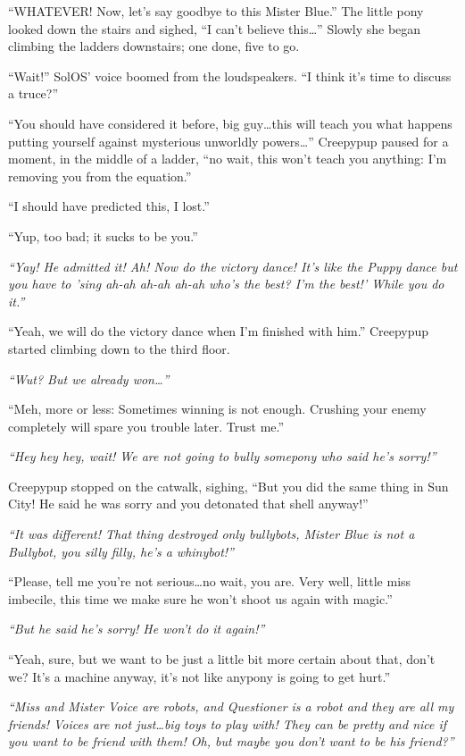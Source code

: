 ``WHATEVER! Now, let's say goodbye to this Mister Blue.'' The little pony looked down the stairs and sighed, ``I can't believe this\dots'' Slowly she began climbing the ladders downstairs; one done, five to go.

``Wait!'' SolOS' voice boomed from the loudspeakers. ``I think it's time to discuss a truce?''

``You should have considered it before, big guy\dots this will teach you what happens putting yourself against mysterious unworldly powers\dots'' Creepypup paused for a moment, in the middle of a ladder, ``no wait, this won't teach you anything: I'm removing you from the equation.''

``I should have predicted this, I lost.''

``Yup, too bad; it sucks to be you.''

\emph{``Yay! He admitted it! Ah! Now do the victory dance! It's like the Puppy dance but you have to 'sing ah-ah ah-ah ah-ah who's the best? I'm the best!' While you do it.''}

``Yeah, we will do the victory dance when I'm finished with him.'' Creepypup started climbing down to the third floor.

\emph{``Wut? But we already won\dots''}

``Meh, more or less: Sometimes winning is not enough. Crushing your enemy completely will spare you trouble later. Trust me.''

\emph{``Hey hey hey, wait! We are not going to bully somepony who said he's sorry!''}

Creepypup stopped on the catwalk, sighing, ``But you did the same thing in Sun City! He said he was sorry and you detonated that shell anyway!''

\emph{``It was different! That thing destroyed only bullybots, Mister Blue is not a Bullybot, you silly filly, he's a whinybot!''}

``Please, tell me you're not serious\dots no wait, you are. Very well, little miss imbecile, this time we make sure he won't shoot us again with magic.''

\emph{``But he said he's sorry! He won't do it again!''}

``Yeah, sure, but we want to be just a little bit more certain about that, don't we? It's a machine anyway, it's not like anypony is going to get hurt.''

\emph{``Miss and Mister Voice are robots, and Questioner is a robot and they are all my friends! Voices are not just\dots big toys to play with! They can be pretty and nice if you want to be friend with them! Oh, but maybe you don't want to be his friend?''}


